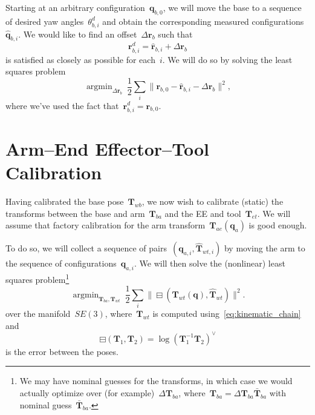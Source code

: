 \documentclass{article}
\DeclareMathOperator*{\argmin}{argmin}
\begin{document}
Starting at an arbitrary configuration~$\bm{q}_{b,0}$, we will move the base to
a sequence of desired yaw angles~$\theta^d_{b,i}$ and obtain the corresponding
measured configurations~$\hat{\bm{q}}_{b,i}$. We would like to find an
offset~$\Delta\bm{r}_b$ such that
\begin{equation}
  \bm{r}^d_{b,i} = \hat{\bm{r}}_{b,i} + \Delta\bm{r}_b
\end{equation}
is satisfied as closely as possible for each~$i$. We will do so by solving the
least squares problem
\begin{equation}\label{eq:contact_force_formulation}
  \argmin_{\Delta\bm{r}_b}\ \frac{1}{2}\sum_i\|\bm{r}_{b,0} - \hat{\bm{r}}_{b,i} - \Delta\bm{r}_b\|^2,
\end{equation}
where we've used the fact that~$\bm{r}^d_{b,i}=\bm{r}_{b,0}$.

\section{Arm--End Effector--Tool Calibration}

Having calibrated the base pose~$\bm{T}_{wb}$, we now wish to calibrate
(static) the transforms between the base and arm~$\bm{T}_{ba}$ and the EE and
tool~$\bm{T}_{et}$. We will assume that factory calibration for the arm
transform~$\bm{T}_{ae}(\bm{q}_a)$ is good enough.

To do so, we will collect a sequence of
pairs~$(\bm{q}_{a,i},\hat{\bm{T}}_{wt,i})$ by moving the arm to the sequence of
configurations~$\bm{q}_{a,i}$. We will then solve the (nonlinear) least squares
problem\footnote{We may have nominal guesses for the transforms, in which case
we would actually optimize over (for example)~$\Delta\bm{T}_{ba}$,
where~$\bm{T}_{ba}=\Delta\bm{T}_{ba}\bar{\bm{T}}_{ba}$ with nominal
guess~$\bar{\bm{T}}_{ba}$.}
\begin{equation}
  \argmin_{\bm{T}_{ba},\bm{T}_{wt}}\ \frac{1}{2}\sum_i\|\boxminus(\bm{T}_{wt}(\bm{q}),\hat{\bm{T}}_{wt})\|^2.
\end{equation}
over the manifold~$SE(3)$, where~$\bm{T}_{wt}$ is computed using~\eqref{eq:kinematic_chain} and
\begin{equation}
  \boxminus(\bm{T}_1,\bm{T}_2) = \log(\bm{T}_1^{-1}\bm{T}_2)^\vee
\end{equation}
is the error between the poses.
\end{document}

